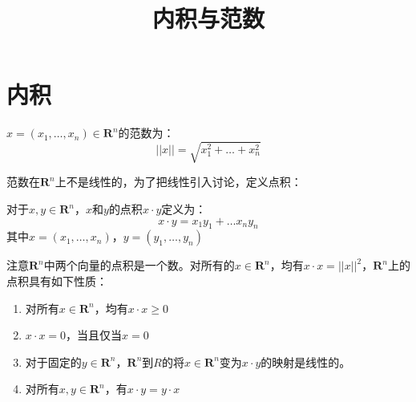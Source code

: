 \documentclass[10pt,a4paper,UTF8]{article}
\date{}
\title{内积与范数}
\begin{document}
\maketitle
\tableofcontents
{}


\section{内积}
\label{sec:orgbf74ed3}


\begin{definition}
\(x=(x_{1},\ldots ,x_{n}) \in \mathbf{R}^{n}\)的范数为：
\begin{equation}
\label{eq:1}
||x|| = \sqrt{x_1^2 + \ldots + x_n^2}
\end{equation}
\end{definition}
范数在\(\mathbf{R}^{n}\)上不是线性的，为了把线性引入讨论，定义点积：

\begin{definition}
对于\(x,y\in \mathbf{R}^{n}\)，\(x\)和\(y\)的点积\(x\cdot y\)定义为：
\begin{equation}
\label{eq:2}
x\cdot y = x_{1}y_{1} + \ldots x_{n}y_{n}
\end{equation}
其中\(x = (x_{1},\ldots ,x_{n})\)，\(y = (y_{1},\ldots ,y_{n})\)
\end{definition}
注意\(\mathbf{R}^{n}\)中两个向量的点积是一个数。对所有的\(x\in \mathbf{R}^{n}\)，均有\(x\cdot x = ||x||^{2}\)，\(\mathbf{R}^{n}\)上的点积具有如下性质：
\begin{enumerate}
\item 对所有\(x\in \mathbf{R}^{n}\)，均有\(x\cdot x \geq 0\)
\item \(x\cdot x = 0\)，当且仅当\(x = 0\)
\item 对于固定的\(y\in \mathbf{R}^{n}\)，\(\mathbf{R}^{n}\)到\(R\)的将\(x\in \mathbf{R}^{n}\)变为\(x\cdot y\)的映射是线性的。
\item 对所有\(x,y\in \mathbf{R}^{n}\)，有\(x\cdot y = y\cdot x\)
\end{enumerate}
\end{document}
